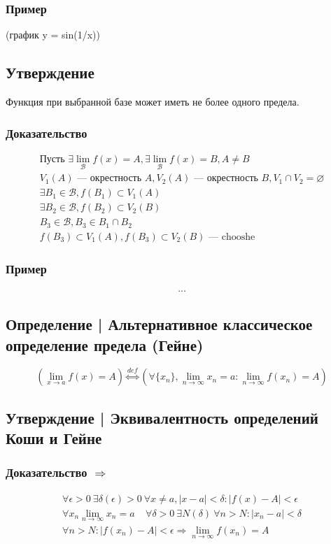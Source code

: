 \documentclass{article}
\begin{document}
\subsubsection{Пример}
(график y = sin(1/x))


\subsection{Утверждение}
Функция при выбранной базе может иметь не более одного предела.

\subsubsection{Доказательство}
\begin{gather*}
    \text{Пусть } \exists \lim_{\mathcal{B}} f(x) = A, \exists \lim_{\mathcal{B}} f(x) = B, A \neq B \\
    V_1(A) \text{ --- окрестность } A, V_2(A) \text{ --- окрестность } B, V_1 \cap V_2 = \varnothing \\
    \exists B_1 \in \mathcal{B}, f(B_1) \subset V_1(A) \\
    \exists B_2 \in \mathcal{B}, f(B_2) \subset V_2(B) \\
    B_3 \in \mathcal{B}, B_3 \in B_1 \cap B_2 \\
    f(B_3) \subset V_1(A), f(B_3) \subset V_2(B) \text{ --- chooshe}
\end{gather*}


\subsubsection{Пример}
\begin{gather*}
    ...    
\end{gather*}


\subsection{Определение | Альтернативное классическое определение предела (Гейне)}
\[
    (\lim_{x \to a} f(x) = A) \overset{def}{\Leftrightarrow} (\forall \{x_n\}, \lim_{n \to \infty} x_n = a: \lim_{n \to \infty} f(x_n) = A)
\]

\subsection{Утверждение | Эквивалентность определений Коши и Гейне}

\subsubsection{Доказательство $\Rightarrow$}
\begin{gather*}
    \forall \epsilon > 0~\exists \delta(\epsilon) > 0~\forall x \neq a, |x - a| < \delta: |f(x) - A| < \epsilon \\
    \forall x_n \lim_{n \to \infty} x_n = a~~~~~\forall \delta > 0~\exists N(\delta)~\forall n > N: |x_n - a| < \delta \\
    \forall n > N: |f(x_n) - A| < \epsilon \Rightarrow \lim_{n \to \infty} f(x_n) = A
\end{gather*}
% 
\end{document}
